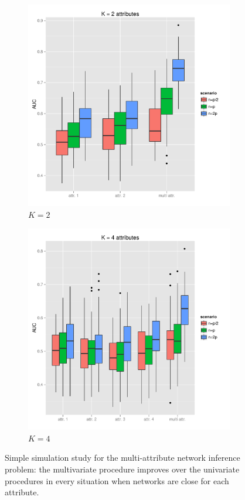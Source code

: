 \begin{figure}[htbp!]
  \centering
  \begin{subfigure}[t]{.495\textwidth}
    \centering
    \includegraphics[width=\textwidth]{figures/res_simu_K=2}
    \caption{$K = 2$}
    \label{fig:simu_multi_k=2}
  \end{subfigure}
  \begin{subfigure}[t]{.495\textwidth}
    \centering
    \includegraphics[width=\textwidth]{figures/res_simu_K=4}
    \caption{$K = 4$}
    
    \label{fig:simu_multi_k=4}
  \end{subfigure}
  \caption{Simple  simulation study  for  the multi-attribute  network
    inference problem:  the multivariate  procedure improves  over the
    univariate procedures in every  situation when networks are close
    for each attribute.}
  \label{fig:simu_multi}
\end{figure}
